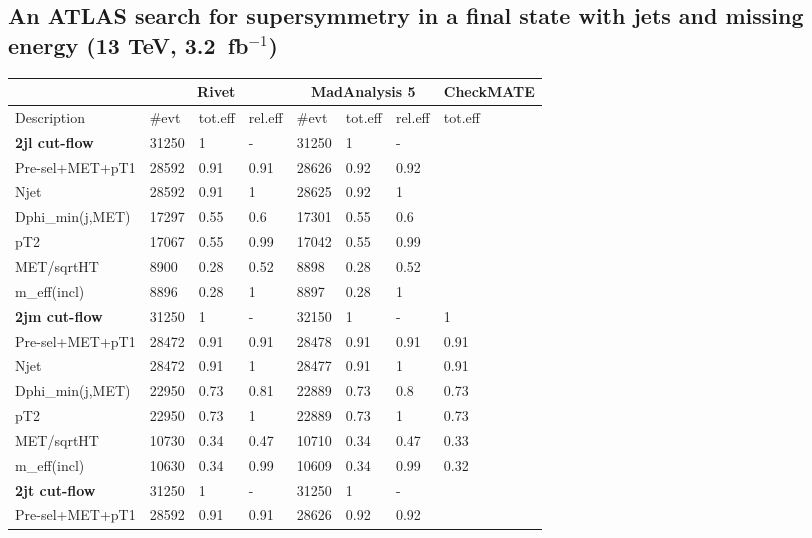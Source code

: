 \documentclass[11pt]{cernrep}
\begin{document}
\subsection{An ATLAS search for supersymmetry in a final
state with jets and missing energy (13 TeV, 3.2~fb$^{-1}$)}

\begin{table}
\footnotesize
 \centering
  \begin{tabular}{ | l || l | l | l || l | l | l || l | }
\hline
    &  \multicolumn{3}{c||}{\bf Rivet} & \multicolumn{3}{c||}{\bf MadAnalysis 5} &   {\bf CheckMATE}   \\ \hline
  Description       & \#evt & tot.eff & rel.eff & \#evt & tot.eff & rel.eff &   tot.eff   \\ \hline \hline
{\bf 2jl cut-flow}                  & 31250 & 1 & - & 31250 & 1 & - & \   \\ \hline
Pre-sel+MET+pT1   & 28592 & 0.91 & 0.91 & 28626 & 0.92 & 0.92 & \   \\ \hline
Njet              & 28592 & 0.91 & 1 & 28625 & 0.92 & 1 & \   \\ \hline
Dphi\_min(j,MET)   & 17297 & 0.55 & 0.6 & 17301 & 0.55 & 0.6 & \   \\ \hline
pT2               & 17067 & 0.55 & 0.99 & 17042 & 0.55 & 0.99 & \   \\ \hline
MET/sqrtHT        & 8900 & 0.28 & 0.52 & 8898 & 0.28 & 0.52 & \   \\ \hline
m\_eff(incl)       & 8896 & 0.28 & 1 & 8897 & 0.28 & 1 & \   \\ \hline
\hline
{\bf 2jm cut-flow} & 31250 & 1 & - & 32150 & 1 & - & 1  \\ \hline
Pre-sel+MET+pT1   & 28472 & 0.91 & 0.91 & 28478 & 0.91 & 0.91 & 0.91  \\ \hline
Njet              & 28472 & 0.91 & 1 & 28477 & 0.91 & 1 & 0.91  \\ \hline
Dphi\_min(j,MET)   & 22950 & 0.73 & 0.81 & 22889 & 0.73 & 0.8 & 0.73  \\ \hline
pT2               & 22950 & 0.73 & 1 & 22889 & 0.73 & 1 & 0.73  \\ \hline
MET/sqrtHT        & 10730 & 0.34 & 0.47 & 10710 & 0.34 & 0.47 & 0.33  \\ \hline
m\_eff(incl)       & 10630 & 0.34 & 0.99 & 10609 & 0.34 & 0.99 & 0.32  \\ \hline
\hline
{\bf 2jt cut-flow} & 31250 & 1 & - & 31250 & 1 & - & \   \\ \hline
Pre-sel+MET+pT1   & 28592 & 0.91 & 0.91 & 28626 & 0.92 & 0.92 & \   \\ \hline

\end{tabular}
\end{table}
\end{document}
